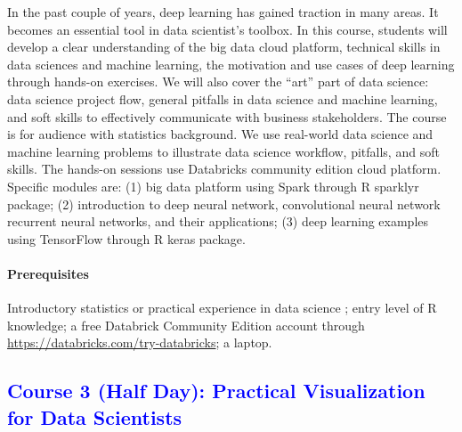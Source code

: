 \documentclass[11pt]{article}
\newcommand{\blue}[1]{{\textcolor{blue}{#1}}}
\newcommand{\pkg}[1]{{\normalfont\fontseries{b}\selectfont #1}}
\begin{document}
In the past couple of years, deep learning has gained traction in many
areas. It becomes an essential tool in data scientist’s toolbox. In
this course, students will develop a clear understanding of the big
data cloud platform, technical skills in data sciences and machine
learning, the motivation and use cases of deep learning through
hands-on exercises. We will also cover the ``art'' part of data
science: data science project flow, general pitfalls in data science
and machine learning, and soft skills to effectively communicate with
business stakeholders. The course is for audience with statistics
background. We use real-world data science and machine learning
problems to illustrate data science workflow, pitfalls, and soft
skills. The hands-on sessions use Databricks community edition cloud
platform. Specific modules are: 
(1) big data platform using Spark through R \pkg{sparklyr} package;
(2) introduction to deep neural network, convolutional neural network
recurrent neural networks, and their applications;
(3) deep learning examples using TensorFlow through R \pkg{keras}
package.


\paragraph{Prerequisites}

Introductory statistics or practical experience in data science ;
entry level of R knowledge; a free Databrick Community Edition account
through \url{https://databricks.com/try-databricks}; a laptop.


\subsection*{\blue{Course 3 (Half Day): Practical Visualization for Data Scientists}}
\end{document}
